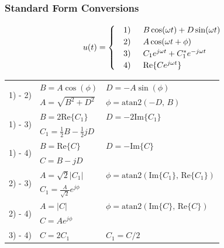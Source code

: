 \documentclass[twocolumn, 12pt]{article}    %
\begin{document}
\subsubsection*{Standard Form Conversions}
\[u(t) = 
\begin{cases}
    & 1) \hspace{15pt} B\cos(\omega t) + D\sin(\omega t)  \\
    & 2) \hspace{15pt} A\cos(\omega t + \phi) \\
    & 3) \hspace{15pt} C_1e^{j\omega t} + C_1^* e^{-j\omega t}\\
    & 4) \hspace{15pt} \mathrm{Re}\{Ce^{j\omega t}\}
\end{cases}
\vspace{-20pt} 
\]
\begin{table}[h!]
    \renewcommand\arraystretch{1.5}
    \centering
    \footnotesize
    \begin{tabular}{l|ll}
    \hline
        \multirow{2}{*}{1) - 2)} & \(B= A\cos(\phi)\) & \(D = -A\sin(\phi)\)\\
         & \(A = \sqrt{B^2 +D^2} \) & \( \phi = \text{atan2}(-D,\,B)\)\\
         \hline
         \multirow{2}{*}{1) - 3)} & \(B=2\mathrm{Re}\{C_1\} \) & \( D = -2\mathrm{Im}\{C_1\}\)\\
         & \(C_1 =\frac{1}{2}B - \frac{1}{2}jD\) & \\
         \hline
         \multirow{2}{*}{1) - 4)} & \(B = \mathrm{Re}\{C\} \) & \(D = -\mathrm{Im}\{C\}\) \\
         & \(C = B-jD\) & \\
         \hline
         \multirow{2}{*}{2) - 3)} & \(A =\sqrt{2}\left| C_1\right| \) & \(\phi = \text{atan2}(\mathrm{Im}\{C_1\},\,\mathrm{Re}\{C_1\})\)\\
         & \(C_1=\frac{A}{\sqrt{2}}e^{j\phi}\) & \\
         \hline
         \multirow{2}{*}{2) - 4)} &\(A = |C| \) &\( \phi = \text{atan2}(\mathrm{Im}\{C\},\,\mathrm{Re}\{C\})\)\\
         & \(C =Ae^{j\phi}\) & \\
         \hline
         3) - 4) & \(C=2C_1 \) & \( C_1=C/2\)\\
         \hline
    \end{tabular}
\end{table}
\vspace{-30pt} 
\end{document}

